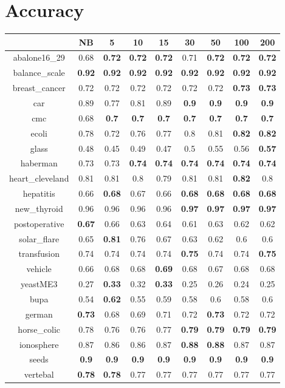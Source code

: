 \documentclass{article}%
\begin{document}
%
\normalsize%
\section*{Accuracy}%
\begin{tabular}{c|cccccccc}%
\hline%
&NB&5&10&15&30&50&100&200\\%
\hline%
abalone16\_29&0.68&\textbf{0.72}&\textbf{0.72}&\textbf{0.72}&0.71&\textbf{0.72}&\textbf{0.72}&\textbf{0.72}\\%
\hline%
balance\_scale&\textbf{0.92}&\textbf{0.92}&\textbf{0.92}&\textbf{0.92}&\textbf{0.92}&\textbf{0.92}&\textbf{0.92}&\textbf{0.92}\\%
\hline%
breast\_cancer&0.72&0.72&0.72&0.72&0.72&0.72&\textbf{0.73}&\textbf{0.73}\\%
\hline%
car&0.89&0.77&0.81&0.89&\textbf{0.9}&\textbf{0.9}&\textbf{0.9}&\textbf{0.9}\\%
\hline%
cmc&0.68&\textbf{0.7}&\textbf{0.7}&\textbf{0.7}&\textbf{0.7}&\textbf{0.7}&\textbf{0.7}&\textbf{0.7}\\%
\hline%
ecoli&0.78&0.72&0.76&0.77&0.8&0.81&\textbf{0.82}&\textbf{0.82}\\%
\hline%
glass&0.48&0.45&0.49&0.47&0.5&0.55&0.56&\textbf{0.57}\\%
\hline%
haberman&0.73&0.73&\textbf{0.74}&\textbf{0.74}&\textbf{0.74}&\textbf{0.74}&\textbf{0.74}&\textbf{0.74}\\%
\hline%
heart\_cleveland&0.81&0.81&0.8&0.79&0.81&0.81&\textbf{0.82}&0.8\\%
\hline%
hepatitis&0.66&\textbf{0.68}&0.67&0.66&\textbf{0.68}&\textbf{0.68}&\textbf{0.68}&\textbf{0.68}\\%
\hline%
new\_thyroid&0.96&0.96&0.96&0.96&\textbf{0.97}&\textbf{0.97}&\textbf{0.97}&\textbf{0.97}\\%
\hline%
postoperative&\textbf{0.67}&0.66&0.63&0.64&0.61&0.63&0.62&0.62\\%
\hline%
solar\_flare&0.65&\textbf{0.81}&0.76&0.67&0.63&0.62&0.6&0.6\\%
\hline%
transfusion&0.74&0.74&0.74&0.74&\textbf{0.75}&0.74&0.74&\textbf{0.75}\\%
\hline%
vehicle&0.66&0.68&0.68&\textbf{0.69}&0.68&0.67&0.68&0.68\\%
\hline%
yeastME3&0.27&\textbf{0.33}&0.32&\textbf{0.33}&0.25&0.26&0.24&0.25\\%
\hline%
bupa&0.54&\textbf{0.62}&0.55&0.59&0.58&0.6&0.58&0.6\\%
\hline%
german&\textbf{0.73}&0.68&0.69&0.71&0.72&\textbf{0.73}&0.72&0.72\\%
\hline%
horse\_colic&0.78&0.76&0.76&0.77&\textbf{0.79}&\textbf{0.79}&\textbf{0.79}&\textbf{0.79}\\%
\hline%
ionosphere&0.87&0.86&0.86&0.87&\textbf{0.88}&\textbf{0.88}&0.87&0.87\\%
\hline%
seeds&\textbf{0.9}&\textbf{0.9}&\textbf{0.9}&\textbf{0.9}&\textbf{0.9}&\textbf{0.9}&\textbf{0.9}&\textbf{0.9}\\%
\hline%
vertebal&\textbf{0.78}&\textbf{0.78}&0.77&0.77&0.77&0.77&0.77&0.77\\%
\hline%
\end{tabular}
\end{document}

